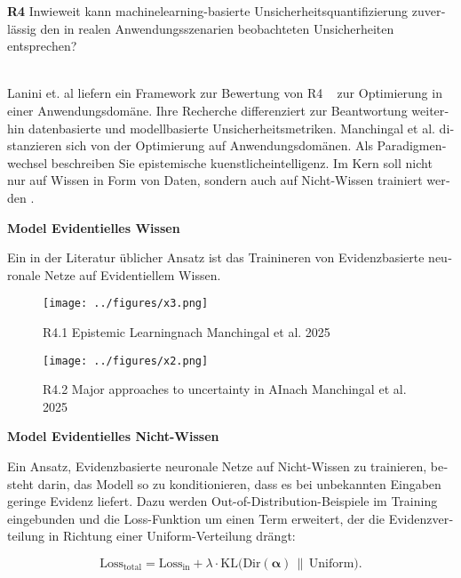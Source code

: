 \begin{otherlanguage}{ngerman}
\textbf{R4} Inwieweit kann \gls{machinelearning}-basierte Unsicherheitsquantifizierung zuverlässig den in realen Anwendungsszenarien beobachteten Unsicherheiten entsprechen?
\par\noindent\\


Lanini et. al liefern ein Framework zur Bewertung von R4 ~\parencite{Lanini2024} zur Optimierung in einer Anwendungsdomäne. Ihre Recherche differenziert zur Beantwortung weiterhin datenbasierte und modellbasierte Unsicherheitsmetriken. 
\newline
Manchingal et al. distanzieren sich von der Optimierung auf Anwendungsdomänen. Als Paradigmenwechsel beschreiben Sie epistemische \gls{kuenstlicheintelligenz}. Im Kern soll nicht nur auf Wissen in Form von Daten, sondern auch auf Nicht-Wissen trainiert werden \parencite{manchingal2025}. 


\pagebreak


\textbf{Model Evidentielles Wissen}

Ein in der Literatur üblicher Ansatz ist das Trainineren von \gls{Evidenzbasierte neuronale Netze} auf Evidentiellem Wissen. 

\begin{figure}[!ht]
  \centering
  \texttt{[image: ../figures/x3.png]}
  \caption{R4.1 \glqq Epistemic Learning\grqq nach Manchingal et al. 2025}
\end{figure}

\begin{figure}[!ht]
  \centering
  \texttt{[image: ../figures/x2.png]}
  \caption{R4.2 \glqq Major approaches to uncertainty in AI\grqq nach Manchingal et al. 2025}
\end{figure}


\textbf{Model Evidentielles Nicht-Wissen}

Ein Ansatz, \gls{Evidenzbasierte neuronale Netze} auf Nicht-Wissen zu trainieren, besteht darin, das Modell so zu konditionieren, dass es bei unbekannten Eingaben geringe Evidenz liefert. Dazu werden \gls{Out-of-Distribution}-Beispiele im Training eingebunden und die Loss-Funktion um einen Term erweitert, der die Evidenzverteilung in Richtung einer Uniform-Verteilung drängt:

\begin{equation}
\text{Loss}_{\text{total}} 
= \text{Loss}_{\text{in}} 
+ \lambda \cdot \text{KL}\bigl(\text{Dir}(\boldsymbol{\alpha}) \,\|\, \text{Uniform}\bigr).
\end{equation}


\end{otherlanguage}
